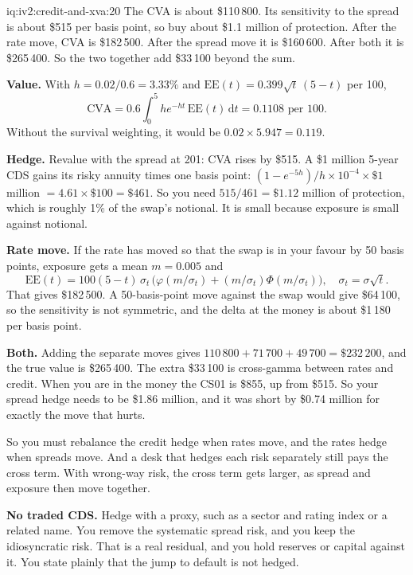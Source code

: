 \begin{solution}{iq:iv2:credit-and-xva:20}
The CVA is about \$110\,800. Its sensitivity to the spread is about \$515 per basis point, so buy about \$1.1 million of protection. After the rate move, CVA is \$182\,500. After the spread move it is \$160\,600. After both it is \$265\,400. So the two together add \$33\,100 beyond the sum.

\textbf{Value.} With $h = 0.02/0.6 = 3.33\%$ and $\mathrm{EE}(t) = 0.399\sqrt{t}\,(5 - t)$ per 100,
\[
\mathrm{CVA} = 0.6 \int_0^5 h e^{-ht}\,\mathrm{EE}(t)\,\mathrm{d}t = 0.1108 \text{ per } 100.
\]
Without the survival weighting, it would be $0.02 \times 5.947 = 0.119$.

\textbf{Hedge.} Revalue with the spread at 201: CVA rises by \$515. A \$1 million 5-year CDS gains its risky annuity times one basis point: $(1 - e^{-5h})/h \times 10^{-4} \times \$1$ million $= 4.61 \times \$100 = \$461$. So you need $515/461 = \$1.12$ million of protection, which is roughly 1\% of the swap's notional. It is small because exposure is small against notional.

\textbf{Rate move.} If the rate has moved so that the swap is in your favour by 50 basis points, exposure gets a mean $m = 0.005$ and
\[
\mathrm{EE}(t) = 100(5 - t)\,\sigma_t\,\bigl(\varphi(m/\sigma_t) + (m/\sigma_t)\Phi(m/\sigma_t)\bigr), \quad \sigma_t = \sigma\sqrt{t}.
\]
That gives \$182\,500. A 50-basis-point move against the swap would give \$64\,100, so the sensitivity is not symmetric, and the delta at the money is about \$1\,180 per basis point.

\textbf{Both.} Adding the separate moves gives $110\,800 + 71\,700 + 49\,700 = \$232\,200$, and the true value is \$265\,400. The extra \$33\,100 is cross-gamma between rates and credit. When you are in the money the CS01 is \$855, up from \$515. So your spread hedge needs to be \$1.86 million, and it was short by \$0.74 million for exactly the move that hurts.

So you must rebalance the credit hedge when rates move, and the rates hedge when spreads move. And a desk that hedges each risk separately still pays the cross term. With wrong-way risk, the cross term gets larger, as spread and exposure then move together.

\textbf{No traded CDS.} Hedge with a proxy, such as a sector and rating index or a related name. You remove the systematic spread risk, and you keep the idiosyncratic risk. That is a real residual, and you hold reserves or capital against it. You state plainly that the jump to default is not hedged.


\end{solution}
